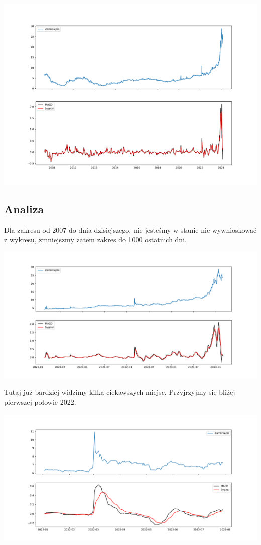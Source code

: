 \documentclass[
]{article}
\begin{document}
\includegraphics{macd_files/figure-latex/unnamed-chunk-1-1.pdf}

\subsection{Analiza}\label{analiza}

Dla zakresu od 2007 do dnia dzisiejszego, nie jesteśmy w stanie nic
wywnioskować z wykresu, zmniejszmy zatem zakres do 1000 ostatnich dni.

\includegraphics{macd_files/figure-latex/unnamed-chunk-2-3.pdf}

Tutaj już bardziej widzimy kilka ciekawszych miejsc. Przyjrzyjmy się
bliżej pierwszej połowie 2022.

\includegraphics{macd_files/figure-latex/unnamed-chunk-3-5.pdf}
\end{document}
